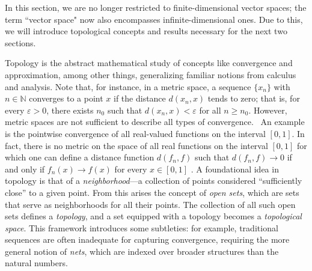 In this section, we are no longer restricted to finite-dimensional vector spaces; the term ``vector space" now also encompasses infinite-dimensional ones. Due to this, we will introduce topological concepts and results necessary for the next two sections.


Topology is the abstract mathematical study of concepts like convergence and approximation, among other things, generalizing familiar notions from calculus and analysis. 
Note that, for instance, in a metric space, a sequence $\{x_n\}$ with $n \in \mathbb{N}$ converges to a point $x$ if the distance $d(x_n, x)$ tends to zero; that is, for every $\varepsilon > 0$, there exists $n_0$ such that $d(x_n, x) < \varepsilon$ for all $n \geq n_0$. However, metric spaces are not sufficient to describe all types of convergence.  An example is the pointwise convergence of all real-valued functions on the interval $[0, 1]$. In fact, there is no metric on the space of all real functions on the interval $[0,1]$ for which one can define a distance function $d(f_n, f)$ such that $d(f_n, f) \to 0$ if and only if $f_n(x) \to f(x)$ for every $x \in [0, 1]$ \cite{guide2006infinite}. 
A foundational idea in topology is that of a \emph{neighborhood}—a collection of points considered ``sufficiently close'' to a given point. From this arises the concept of \emph{open sets}, which are sets that serve as neighborhoods for all their points. The collection of all such open sets defines a \emph{topology}, and a set equipped with a topology becomes a \emph{topological space}. This framework introduces some subtleties: for example, traditional sequences are often inadequate for capturing convergence, requiring the more general notion of \emph{nets}, which are indexed over broader structures than the natural numbers.

